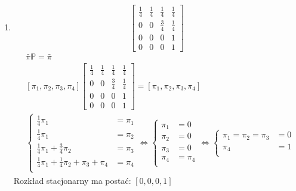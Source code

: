 \documentclass[a4paper,12pt]{article}
\theoremstyle{definition}%
\theoremstyle{definition}
\theoremstyle{problem}
\begin{document}
\begin{enumerate}[label=\alph*)]
\item 
$$\begin{bmatrix}
\frac{1}{4}&\frac{1}{4}&\frac{1}{4}&\frac{1}{4}\\
0&0&\frac{3}{4}&\frac{1}{4}\\
0&0&0&1\\
0&0&0&1
\end{bmatrix}$$
\begin{align*}
&\bar{\pi}\mathbb{P}=\bar{\pi}\\
&\left[\pi _1, \pi _2,\pi _3,\pi _4\right]\begin{bmatrix}
\frac{1}{4}&\frac{1}{4}&\frac{1}{4}&\frac{1}{4}\\
0&0&\frac{3}{4}&\frac{1}{4}\\
0&0&0&1\\
0&0&0&1
\end{bmatrix} = \left[\pi _1, \pi _2,\pi _3,\pi _4\right]\\
&\left\{\begin{matrix}
\frac{1}{4}\pi _1 &= \pi _1\\
\frac{1}{4}\pi _1 &= \pi _2\\
\frac{1}{4}\pi _1 +\frac{3}{4} \pi _2&= \pi _3\\
\frac{1}{4}\pi _1 +\frac{1}{4} \pi _2+\pi _3 + \pi _4&= \pi _4\\
\end{matrix}\right.\Leftrightarrow \left\{\begin{matrix}
\pi _1 &= 0\\
\pi _2 &= 0\\
\pi _3&= 0\\
\pi _4&= \pi _4\\
\end{matrix}\right. \Leftrightarrow \left\{\begin{matrix}
\pi _1 = \pi _2=\pi _3 &= 0\\
\pi _4&= 1\\
\end{matrix}\right.
\end{align*}
Rozkład stacjonarny ma postać: $\left[0, 0, 0, 1\right]$


\end{enumerate}
\end{document}

